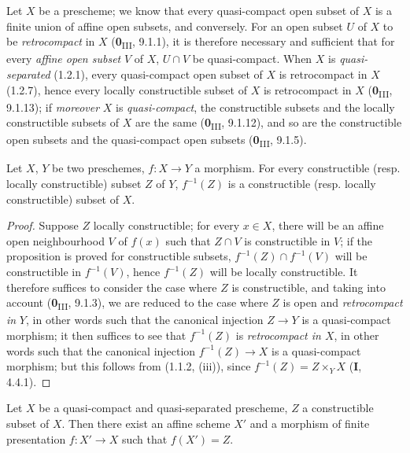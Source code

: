 
\begin{env}[1.8.1]
\label{IV.1.8.1}
Let $X$ be a prescheme; we know that every quasi-compact open subset of $X$
is a finite union of affine open subsets, and conversely. For an open subset
$U$ of $X$ to be \emph{retrocompact} in $X$ (\textbf{0}\textsubscript{III}, 9.1.1), it
is therefore necessary and sufficient that for every \emph{affine open subset}
$V$ of $X$, $U\cap V$ be quasi-compact. When $X$ is \emph{quasi-separated}
(1.2.1), every quasi-compact open subset of $X$ is retrocompact in $X$
(1.2.7), hence every locally constructible subset of $X$ is retrocompact in
$X$ (\textbf{0}\textsubscript{III}, 9.1.13); if \emph{moreover} $X$ is
\emph{quasi-compact}, the constructible subsets and the locally constructible
subsets of $X$ are the same (\textbf{0}\textsubscript{III}, 9.1.12), and so are the
constructible open subsets and the quasi-compact open subsets
(\textbf{0}\textsubscript{III}, 9.1.5).
\end{env}

\begin{proposition}[1.8.2]
\label{IV.1.8.2}
Let $X$, $Y$ be two preschemes, $f:X\to Y$ a morphism. For every
constructible (\textup{resp.} locally constructible) subset $Z$ of $Y$, $f^{-1}(Z)$ is
a constructible (\textup{resp.} locally constructible) subset of $X$.
\end{proposition}

\begin{proof}
Suppose $Z$ locally constructible; for every $x\in X$, there will be an
affine open neighbourhood $V$ of $f(x)$ such that $Z\cap V$ is constructible
in $V$; if the proposition is proved for constructible subsets,
$f^{-1}(Z)\cap f^{-1}(V)$ will be constructible in $f^{-1}(V)$, hence
$f^{-1}(Z)$ will be locally constructible. It therefore suffices to consider
the case where $Z$ is constructible, and taking into account
(\textbf{0}\textsubscript{III}, 9.1.3), we are reduced to the case where $Z$ is open
and \emph{retrocompact in} $Y$, in other words such that the canonical
injection $Z\to Y$ is a quasi-compact morphism; it then suffices to see that
$f^{-1}(Z)$ is \emph{retrocompact in $X$}, in other words such that the
canonical injection $f^{-1}(Z)\to X$ is a quasi-compact morphism; but this
follows from (1.1.2, (iii)), since $f^{-1}(Z)=Z\times_YX$ (\textbf{I}, 4.4.1).
\end{proof}

\begin{lemma}[1.8.3]
\label{IV.1.8.3}
Let $X$ be a quasi-compact and quasi-separated prescheme, $Z$ a
constructible subset of $X$. Then there exist an affine scheme $X'$ and a
morphism of finite presentation $f:X'\to X$ such that $f(X')=Z$.
\end{lemma}

